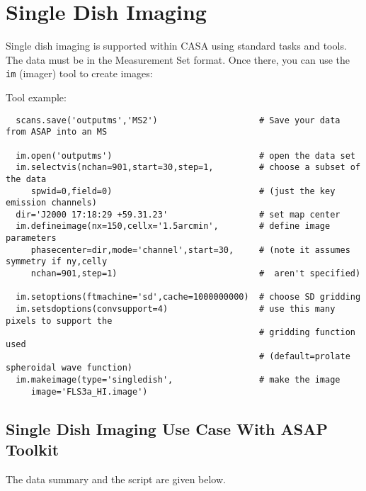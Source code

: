 \section{Single Dish Imaging}
\label{section:sd.imaging}

Single dish imaging is supported within CASA using standard
tasks and tools. The data must be in the Measurement Set format. Once
there, you can use the {\tt im} (imager) tool
to create images:

Tool example:

\small
\begin{verbatim}
  scans.save('outputms','MS2')                    # Save your data from ASAP into an MS

  im.open('outputms')                             # open the data set
  im.selectvis(nchan=901,start=30,step=1,         # choose a subset of the data   
     spwid=0,field=0)                             # (just the key emission channels) 
  dir='J2000 17:18:29 +59.31.23'                  # set map center                
  im.defineimage(nx=150,cellx='1.5arcmin',        # define image parameters
     phasecenter=dir,mode='channel',start=30,     # (note it assumes symmetry if ny,celly 
     nchan=901,step=1)                            #  aren't specified)
                                                                       
  im.setoptions(ftmachine='sd',cache=1000000000)  # choose SD gridding                
  im.setsdoptions(convsupport=4)                  # use this many pixels to support the 
                                                  # gridding function used
                                                  # (default=prolate spheroidal wave function)
  im.makeimage(type='singledish',                 # make the image
     image='FLS3a_HI.image') 
\end{verbatim}
\normalsize

\subsection{Single Dish Imaging Use Case With ASAP Toolkit}
\label{subsection:sd.imaging.usecase}

The data summary and the script are given below. 

